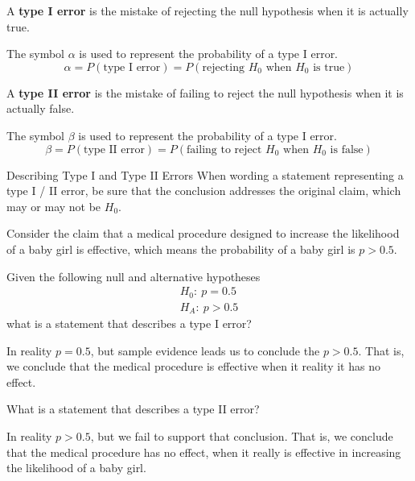 \documentclass{beamer}
\newcommand{\prob}[1]{P\left(#1\right)}
\newcommand{\nullhypothesis}[1]{H_0:~{#1}}
\newcommand{\althypothesis}[1]{H_A:~{#1}}
\begin{document}
\begin{frame}
\begin{definition}
A \textbf{type I error} is the mistake of rejecting the null hypothesis when it is actually true.

\vspace{2mm}
The symbol $\alpha$ is used to represent the probability of a type I error.
\begin{equation*}
\alpha = \prob{\text{type I error}} = \prob{\text{rejecting $H_0$ when $H_0$ is true}}
\end{equation*}
\end{definition}\pause

\begin{definition}
A \textbf{type II error} is the mistake of failing to reject the null hypothesis when it is actually false.

\vspace{2mm}
The symbol $\beta$ is used to represent the probability of a type I error.
\begin{equation*}
\beta = \prob{\text{type II error}} = \prob{\text{failing to reject $H_0$ when $H_0$ is false}}
\end{equation*}
\end{definition}\pause

\begin{block}{Describing Type I and Type II Errors}
When wording a statement representing a type I / II error, be sure that the conclusion addresses the original claim, which may or may not be $H_0$.
\end{block}
\end{frame}

\begin{frame}
\begin{example}
Consider the claim that a medical procedure designed to increase the likelihood of a baby girl is effective, which means the probability of a baby girl is $p>0.5$.\pause

\vspace{2mm}
Given the following null and alternative hypotheses
\begin{equation*}
\begin{aligned}
\nullhypothesis{p=0.5} \\
\althypothesis{p>0.5}
\end{aligned}
\end{equation*}
what is a statement that describes a type I error?\pause

\vspace{2mm}
In reality $p=0.5$, but sample evidence leads us to conclude the $p>0.5$. That is, we conclude that the medical procedure is effective when it reality it has no effect.\pause

\vspace{2mm}
What is a statement that describes a type II error?\pause

\vspace{2mm}
In reality $p>0.5$, but we fail to support that conclusion. That is, we conclude that the medical procedure has no effect, when it really is effective in increasing the likelihood of a baby girl.
\end{example}
\end{frame}
\end{document}
